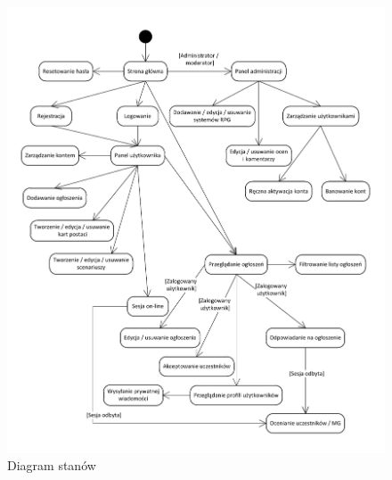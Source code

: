 \begin{figure}[h!]
\begin{center}
\centerline{\includegraphics[scale=1]{./img/STD}}
\caption[Diagram stanów]{Diagram stanów}
\label{fig:STD}
\end{center}
\end{figure}
